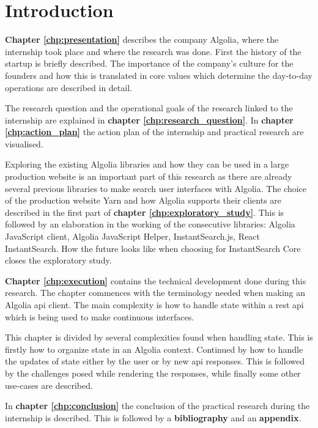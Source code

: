 
\chapter{Introduction} %
\label{chp:introduction}

\textbf{Chapter \ref{chp:presentation}} describes the company Algolia, where the internship took place and where the research was done. First the history of the startup is briefly described. The importance of the company's culture for the founders and how this is translated in core values which determine the day-to-day operations are described in detail.

The research question and the operational goals of the research linked to the internship are explained in \textbf{chapter \ref{chp:research_question}}. 
In \textbf{chapter \ref{chp:action_plan}} the action plan of the internship and practical research are visualised.

Exploring the existing Algolia libraries and how they can be used in a large production website is an important part of this research as there are already several previous libraries to make search user interfaces with Algolia. The choice of the production website Yarn\cite{yarn-site} and how Algolia supports their clients are described in the first part of \textbf{chapter \ref{chp:exploratory_study}}. This is followed by an elaboration in the working of the consecutive libraries: Algolia JavaScript client, Algolia JavaScript Helper, InstantSearch.js, React InstantSearch. How the future looks like when choosing for InstantSearch Core closes the exploratory study.

\textbf{Chapter \ref{chp:execution}} contains the technical development done during this research. The chapter commences with the terminology needed when making an Algolia \acrshort{api} client. The main complexity is how to handle state within a \acrshort{rest} \acrshort{api} which is being used to make continuous interfaces. 

This chapter is divided by several complexities found when handling state. This is firstly how to organize state in an Algolia context. Continued by how to handle the updates of state either by the user or by new \acrshort{api} responses. This is followed by the challenges posed while rendering the responses, while finally some other use-cases are described.

In \textbf{chapter \ref{chp:conclusion}} the conclusion of the practical research during the internship is described. This is followed by a \textbf{bibliography} and an \textbf{appendix}.
